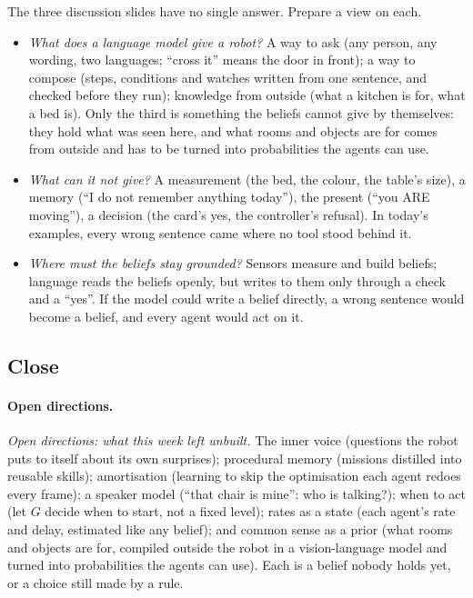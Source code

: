 \documentclass[11pt]{article}
\newcommand{\slt}[1]{\emph{#1}}   %
\begin{document}
The three discussion slides have no single answer. Prepare a view on each.
\begin{itemize}
\item \slt{What does a language model give a robot?} A way to ask (any person, any wording, two languages; ``cross it'' means the door in front); a way to compose (steps, conditions and watches written from one sentence, and checked before they run); knowledge from outside (what a kitchen is for, what a bed is). Only the third is something the beliefs cannot give by themselves: they hold what was seen here, and what rooms and objects are for comes from outside and has to be turned into probabilities the agents can use.
\item \slt{What can it not give?} A measurement (the bed, the colour, the table's size), a memory (``I do not remember anything today''), the present (``you ARE moving''), a decision (the card's yes, the controller's refusal). In today's examples, every wrong sentence came where no tool stood behind it.
\item \slt{Where must the beliefs stay grounded?} Sensors measure and build beliefs; language reads the beliefs openly, but writes to them only through a check and a ``yes''. If the model could write a belief directly, a wrong sentence would become a belief, and every agent would act on it.
\end{itemize}

\subsection{Close}

\paragraph{Open directions.} \slt{Open directions: what this week left unbuilt.} The inner voice (questions the robot puts to itself about its own surprises); procedural memory (missions distilled into reusable skills); amortisation (learning to skip the optimisation each agent redoes every frame); a speaker model (``that chair is mine'': who is talking?); when to act (let $G$ decide when to start, not a fixed level); rates as a state (each agent's rate and delay, estimated like any belief); and common sense as a prior (what rooms and objects are for, compiled outside the robot in a vision-language model and turned into probabilities the agents can use). Each is a belief nobody holds yet, or a choice still made by a rule.
\end{document}
